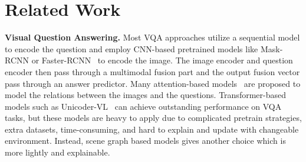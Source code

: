 \documentclass[letterpaper]{article} %
\begin{document}
\section{Related Work}
\noindent\textbf{Visual Question Answering.}
Most VQA approaches utilize a sequential model to encode the question and employ CNN-based pretrained models like Mask-RCNN or Faster-RCNN~\cite{DBLP:conf/cvpr/FanZ18,DBLP:conf/cvpr/PatroN18,DBLP:conf/cvpr/NamHK17} to encode the image.
The image encoder and question encoder then pass through a multimodal fusion part and the output fusion vector pass through an answer predictor.
Many attention-based models~\cite{DBLP:conf/cvpr/00010BT0GZ18,DBLP:conf/cvpr/YangHGDS16,DBLP:conf/eccv/XuS16,DBLP:conf/nips/LuYBP16,DBLP:conf/iclr/HudsonM18} are proposed to model the relations between the images and the questions.
Transformer-based models such as Unicoder-VL~\cite{DBLP:conf/aaai/LiDFGJ20} can achieve outstanding performance on VQA tasks, but these models are heavy to apply due to complicated pretrain strategies, extra datasets, time-consuming, and hard to explain and update with changeable environment. Instead, scene graph based models gives another choice which is more lightly and explainable.
\end{document}
